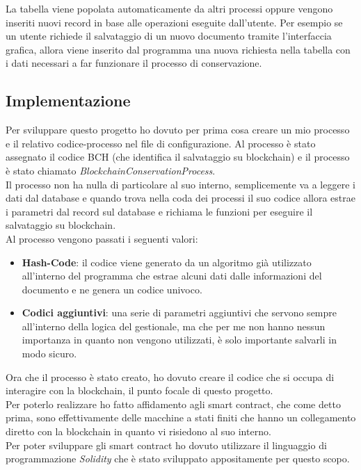 La tabella viene popolata automaticamente da altri processi oppure vengono
inseriti nuovi record in base alle operazioni eseguite dall'utente. Per esempio
se un utente richiede il salvataggio di un nuovo documento tramite
l'interfaccia grafica, allora viene inserito dal programma una nuova richiesta
nella tabella con i dati necessari a far funzionare il processo di
conservazione.

\subsection{Implementazione}
Per sviluppare questo progetto ho dovuto per prima cosa creare un mio processo
e il relativo codice-processo nel file di configurazione. Al processo è stato
assegnato il codice BCH (che identifica il salvataggio su blockchain) e il
processo è stato chiamato \textit{BlockchainConservationProcess}. \\
Il processo non ha nulla di particolare al suo interno, semplicemente va a 
leggere i dati dal database e quando trova nella coda dei processi il suo codice
allora estrae i parametri dal record sul database e richiama le funzioni per 
eseguire il salvataggio su blockchain. \\
Al processo vengono passati i seguenti valori:
\begin{itemize}
    \item \textbf{Hash-Code}: il codice viene generato da un algoritmo già 
        utilizzato all'interno del programma che estrae alcuni dati dalle 
        informazioni del documento e ne genera un codice univoco.
    \item \textbf{Codici aggiuntivi}: una serie di parametri aggiuntivi che
        servono sempre all'interno della logica del gestionale, ma che per me
        non hanno nessun importanza in quanto non vengono utilizzati, è solo
        importante salvarli in modo sicuro.
\end{itemize}

Ora che il processo è stato creato, ho dovuto creare il codice che si occupa
di interagire con la blockchain, il punto focale di questo progetto. \\
Per poterlo realizzare ho fatto affidamento agli smart contract, che come 
detto prima, sono effettivamente delle macchine a stati finiti che hanno un 
collegamento diretto con la blockchain in quanto vi risiedono al suo interno.\\
Per poter sviluppare gli smart contract ho dovuto utilizzare il linguaggio di
programmazione \textit{Solidity} che è stato sviluppato appositamente per
questo scopo. \\


